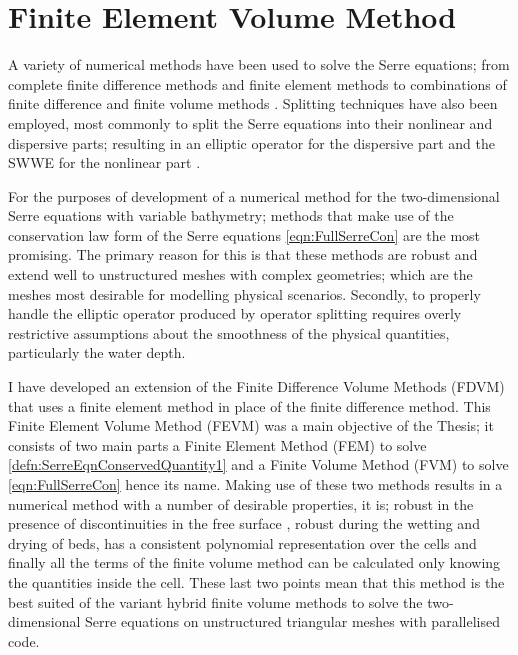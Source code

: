 \chapter{Finite Element Volume Method}
\label{chp:HFVMMethod}
A variety of numerical methods have been used to solve the Serre equations; from complete finite difference methods \cite{Cienfuegos-etal-2006-1217,El-etal-2006} and finite element methods \cite{Mitsotakis-etal-2014,Li-2014-169,Mitsotakis-etal-2017} to combinations of finite difference and finite volume methods \cite{Hank-etal-2010-2034,Zoppou-etal-2017}. Splitting techniques have also been employed, most commonly to split the Serre equations into their nonlinear and dispersive parts; resulting in an elliptic operator for the dispersive part and the SWWE for the nonlinear part \cite{Bradford-Sanders-2002-953,Dutykh-etal-2013-761,Filippini-etal-2016-381}. 

For the purposes of development of a numerical method for the two-dimensional Serre equations with variable bathymetry; methods that make use of the conservation law form of the Serre equations \eqref{eqn:FullSerreCon} \cite{Hank-etal-2010-2034,Li-2014-169,Zoppou-etal-2017} are the most promising. The primary reason for this is that these methods are robust and extend well to unstructured meshes with complex geometries; which are the meshes most desirable for modelling physical scenarios. Secondly, to properly handle the elliptic operator produced by operator splitting requires overly restrictive assumptions about the smoothness of the physical quantities, particularly the water depth. 

I have developed an extension of the Finite Difference Volume Methods (FDVM) \cite{Hank-etal-2010-2034,Zoppou-etal-2017} that uses a finite element method in place of the finite difference method. This Finite Element Volume Method (FEVM) was a main objective of the Thesis; it consists of two main parts a Finite Element Method (FEM) to solve \eqref{defn:SerreEqnConservedQuantity1} and a Finite Volume Method (FVM) to solve \eqref{eqn:FullSerreCon} hence its name. Making use of these two methods results in a numerical method with a number of desirable properties, it is; robust in the presence of discontinuities in the free surface \cite{Pitt-2018-61}, robust during the wetting and drying of beds, has a consistent polynomial representation over the cells and finally all the terms of the finite volume method can be calculated only knowing the quantities inside the cell. These last two points mean that this method is the best suited of the variant hybrid finite volume methods \cite{Zoppou-etal-2017} to solve the two-dimensional Serre equations on unstructured triangular meshes with parallelised code.   

